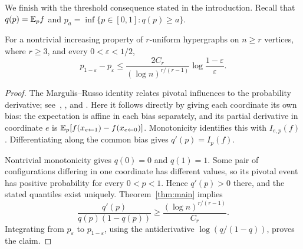 We finish with the threshold consequence stated in the introduction.
Recall that $q(p)=\mathbb E_p f$ and
$p_a=\inf\{p\in[0,1]:q(p)\ge a\}$.

\begin{corollary}\label{cor:threshold}
For a nontrivial increasing property of $r$-uniform hypergraphs on
$n\ge r$ vertices, where $r\ge3$, and every $0<\varepsilon<1/2$,
\[
 p_{1-\varepsilon}-p_\varepsilon
 \le\frac{2C_r}{(\log n)^{r/(r-1)}}
                  \log\frac{1-\varepsilon}{\varepsilon}.
\]
\end{corollary}

\begin{proof}
The Margulis--Russo identity relates pivotal influences to the
probability derivative; see~\cite{Margulis74},
\cite[Lemma~3]{Russo81}, and \cite[Lemma~2.2]{FK96}.
Here it follows directly by giving each coordinate
its own bias: the expectation is affine in each bias separately,
and its partial derivative in coordinate $e$ is
$\mathbb E_p[f(x_{e\leftarrow1})-f(x_{e\leftarrow0})]$.
Monotonicity identifies this with $I_{e,p}(f)$. Differentiating
along the common bias gives $q'(p)=I_p(f)$.

Nontrivial monotonicity gives $q(0)=0$ and $q(1)=1$. Some pair of
configurations differing in one coordinate has different values,
so its pivotal event has positive probability for every $0<p<1$.
Hence $q'(p)>0$ there, and the stated quantiles exist uniquely.
Theorem~\ref{thm:main} implies
\[
 \frac{q'(p)}{q(p)(1-q(p))}
 \ge\frac{(\log n)^{r/(r-1)}}{C_r}.
\]
Integrating from $p_\varepsilon$ to $p_{1-\varepsilon}$, using
the antiderivative $\log(q/(1-q))$, proves the claim.
\end{proof}
